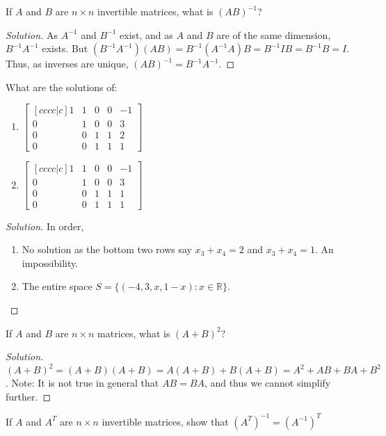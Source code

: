 \documentclass[../main.tex]{subfiles}
\begin{document}
%
\begin{problem}
If $A$ and $B$ are $n\times n$ invertible matrices, what is $(AB)^{-1}$?
\end{problem}
\begin{proof}[Solution]
As $A^{-1}$ and $B^{-1}$ exist, and as $A$ and $B$ are of the same dimension, $B^{-1}A^{-1}$ exists. But $(B^{-1}A^{-1})(AB) = B^{-1}(A^{-1}A)B = B^{-1}IB = B^{-1}B = I$. Thus, as inverses are unique, $(AB)^{-1} = B^{-1}A^{-1}$.
\end{proof}
%
\begin{problem}
What are the solutions of:
\begin{enumerate}
\item $\begin{bmatrix}[cccc|c] 1 & 1 & 0 & 0 & -1 \\ 0 & 1 & 0 & 0 & 3 \\ 0 & 0 & 1 & 1 & 2 \\ 0 & 0 & 1 & 1 & 1 \end{bmatrix}$
\item $\begin{bmatrix}[cccc|c] 1 & 1 & 0 & 0 & -1 \\ 0 & 1 & 0 & 0 & 3 \\ 0 & 0 & 1 & 1 & 1 \\ 0 & 0 & 1 & 1 & 1 \end{bmatrix}$
\end{enumerate}
\end{problem}
\begin{proof}[Solution]
In order,
\begin{enumerate}
\item No solution as the bottom two rows say $x_3 + x_4 = 2$ and $x_3 + x_4 = 1$. An impossibility.
\item The entire space $S = \{(-4,3,x,1-x):x\in \mathbb{R}\}$.
\end{enumerate}
\end{proof}
%
\begin{problem}
If $A$ and $B$ are $n\times n$ matrices, what is $(A+B)^2$?
\end{problem}
\begin{proof}[Solution]
$(A+B)^2 =(A+B)(A+B) = A(A+B)+B(A+B)=A^2+AB+BA+B^2$. Note: It is not true in general that $AB=BA$, and thus we cannot simplify further.
\end{proof}
%
\begin{problem}
If $A$ and $A^T$ are $n\times n$ invertible matrices, show that $(A^T)^{-1} = (A^{-1})^T$
\end{problem}
\end{document}
